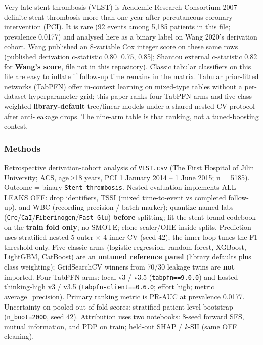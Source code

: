 \documentclass[
]{article}
\begin{document}
Very late stent thrombosis (VLST) is Academic Research Consortium 2007
definite stent thrombosis more than one year after percutaneous coronary
intervention (PCI). It is rare (92 events among 5,185 patients in this
file; prevalence 0.0177) and analysed here as a binary label on Wang
2020's derivation cohort. Wang published an 8-variable Cox integer score
on these same rows (published derivation c-statistic 0.80 {[}0.75,
0.85{]}; Shantou external c-statistic 0.82 for \textbf{Wang's score},
file not in this repository). Classic tabular classifiers on this file
are easy to inflate if follow-up time remains in the matrix. Tabular
prior-fitted networks (TabPFN) offer in-context learning on mixed-type
tables without a per-dataset hyperparameter grid; this paper ranks four
TabPFN arms and five class-weighted \textbf{library-default} tree/linear
models under a shared nested-CV protocol after anti-leakage drops. The
nine-arm table is that ranking, not a tuned-boosting contest.

\subsubsection{Methods}\label{methods}

Retrospective derivation-cohort analysis of \texttt{VLST.csv} (The First
Hospital of Jilin University; ACS, age ≥18 years, PCI 1 January 2014 --
1 June 2015; n = 5185). Outcome = binary \texttt{Stent\ thrombosis}.
Nested evaluation implements ALL LEAKS OFF: drop identifiers, TSSI
(mixed time-to-event vs completed follow-up), and WBC
(recording-precision / batch marker); quantize named labs
(\texttt{Cre}/\texttt{CaI}/\texttt{Fiberinogen}/\texttt{Fast-Glu})
\textbf{before} splitting; fit the stent-brand codebook on the
\textbf{train fold only}; no SMOTE; clone scaler/OHE inside splits.
Prediction uses stratified nested 5 outer × 4 inner CV (seed 42); the
inner loop tunes the F1 threshold only. Five classic arms (logistic
regression, random forest, XGBoost, LightGBM, CatBoost) are an
\textbf{untuned reference panel} (library defaults plus class
weighting); GridSearchCV winners from 70/30 leakage twins are
\textbf{not} imported. Four TabPFN arms: local v3 / v3.5
(\texttt{tabpfn==9.0.0}) and hosted thinking-high v3 / v3.5
(\texttt{tabpfn-client==0.6.0}; effort high; metric average\_precision).
Primary ranking metric is PR-AUC at prevalence 0.0177. Uncertainty on
pooled out-of-fold scores: stratified patient-level bootstrap
(\texttt{n\_boot=2000}, seed 42). Attribution uses two notebooks: 8-seed
forward SFS, mutual information, and PDP on train; held-out SHAP /
\emph{k}-SII (same OFF cleaning).
\end{document}
